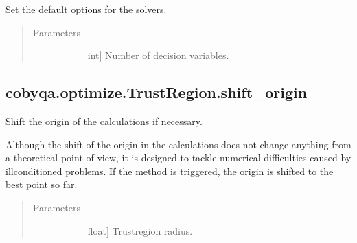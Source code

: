 \documentclass[letterpaper,10pt,english]{sphinxmanual}
\begin{document}
\begin{fulllineitems}
\begin{fulllineitems}
\label{\detokenize{refs/generated/cobyqa.optimize.TrustRegion.set_default_options:cobyqa.optimize.TrustRegion.set_default_options}}
\sphinxAtStartPar
Set the default options for the solvers.
\begin{quote}\begin{description}
\item[{Parameters}] \leavevmode\begin{description}
\item[{}] \leavevmode{[}int{]}
\sphinxAtStartPar
Number of decision variables.

\end{description}

\end{description}\end{quote}

\end{fulllineitems}



\subsection{cobyqa.optimize.TrustRegion.shift\_origin}
\label{\detokenize{refs/generated/cobyqa.optimize.TrustRegion.shift_origin:cobyqa-optimize-trustregion-shift-origin}}\label{\detokenize{refs/generated/cobyqa.optimize.TrustRegion.shift_origin::doc}}

\begin{fulllineitems}
\label{\detokenize{refs/generated/cobyqa.optimize.TrustRegion.shift_origin:cobyqa.optimize.TrustRegion.shift_origin}}
\sphinxAtStartPar
Shift the origin of the calculations if necessary.

\sphinxAtStartPar
Although the shift of the origin in the calculations does not change
anything from a theoretical point of view, it is designed to tackle
numerical difficulties caused by ill\sphinxhyphen{}conditioned problems. If the method
is triggered, the origin is shifted to the best point so far.
\begin{quote}\begin{description}
\item[{Parameters}] \leavevmode\begin{description}
\item[{}] \leavevmode{[}float{]}
\sphinxAtStartPar
Trust\sphinxhyphen{}region radius.


\end{description}
\end{description}
\end{quote}
\end{fulllineitems}
\end{fulllineitems}
\end{document}
